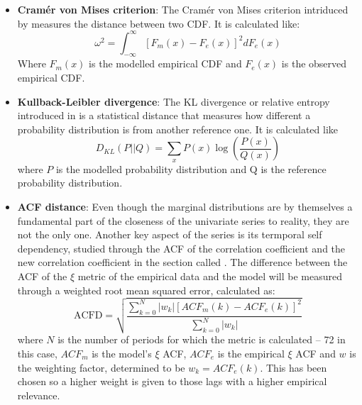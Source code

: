 \begin{itemize}
    \item \textbf{Cramér von Mises criterion}: The Cramér von Mises criterion intriduced by \cite{cramer_28} measures the distance between two CDF. It is calculated like:
    \begin{equation}
        \omega^2=\int_{-\infty}^{\infty}\left[F_m\left(x\right)-F_e\left(x\right)\right]^2dF_e\left(x\right)
    \end{equation}
    Where $F_m\left(x\right)$ is the modelled empirical CDF and $F_e\left(x\right)$ is the observed empirical CDF.
    \item \textbf{Kullback-Leibler divergence}: The KL divergence or relative entropy introduced in \cite{kullback_leibler_1951} is a statistical distance that measures how different a probability distribution is from another reference one. It is calculated like
    \begin{equation}
        D_{KL}\left(P||Q\right)=\sum_x P\left(x\right)\log{\left(\frac{P\left(x\right)}{Q\left(x\right)}\right)}
    \end{equation}
    where $P$ is the modelled probability distribution and Q is the reference probability distribution.
    \item \textbf{ACF distance}: Even though the marginal distributions are by themselves a fundamental part of the closeness of the univariate series to reality, they are not the only one. Another key aspect of the series is its termporal self dependency, studied through the ACF of the correlation coefficient and the new correlation coefficient in the section called . The difference between the ACF of the $\xi$ metric of the empirical data and the model will be measured through a weighted root mean squared error, calculated as:
    \begin{equation}
        \text{ACFD}=\sqrt{\frac{\sum_{k=0}^N |w_k|\left[ACF_m\left(k\right)-ACF_e\left(k\right)\right]^2}{\sum_{k=0}^N |w_k|}}
    \end{equation}
    where $N$ is the number of periods for which the metric is calculated -- 72 in this case, $ACF_m$ is the model's $\xi$ ACF, $ACF_e$ is the empirical $\xi$ ACF and $w$ is the weighting factor, determined to be $w_k=ACF_e\left(k\right)$. This has been chosen so a higher weight is given to those lags with a higher empirical relevance. 
\end{itemize}
